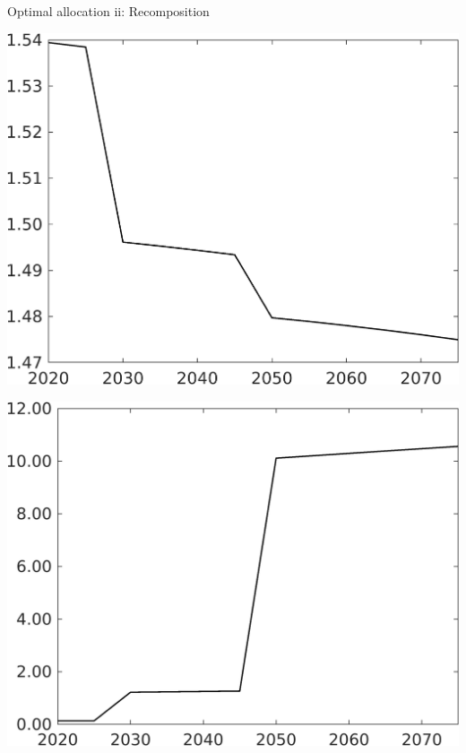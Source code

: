\documentclass[11pt,aspectratio=169]{beamer}
\begin{document}
\begin{frame}{Optimal allocation ii: Recomposition}
	
	\begin{minipage}[]{0.32\textwidth}
		\includegraphics[width=1\textwidth]{../codding_model/own_basedOnFried/optimalPol_elastS_DisuSci/figures/all_1705/Single_OPT_T_NoTaus_hhhl_spillover0_sep1_BN1_ineq0_red0_etaa0.79.png}
	\end{minipage}
	\begin{minipage}[]{0.32\textwidth}
		\includegraphics[width=1\textwidth]{../codding_model/own_basedOnFried/optimalPol_elastS_DisuSci/figures/all_1705/Single_OPT_T_NoTaus_GFF_spillover0_sep1_BN1_ineq0_red0_etaa0.79.png}

\end{minipage}
\end{frame}
\end{document}
